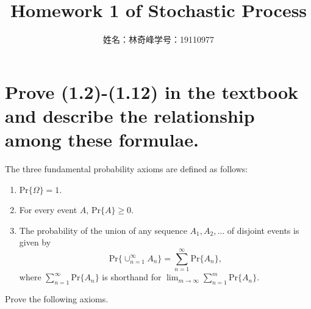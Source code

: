 \documentclass[UTF8]{article}
\begin{document}
    \title{Homework 1 of Stochastic Process}
    \author{姓名：林奇峰\qquad 学号：19110977}
    \maketitle

    \section{Prove (1.2)-(1.12) in the textbook and describe the relationship among these formulae.}

    The three fundamental probability axioms are defined as follows:
    \begin{enumerate}
        \item $\text{Pr}\{\Omega\}=1$.
        \item For every event $A$, $\text{Pr}\{A\}\geq0$. 
        \item The probability of the union of any sequence $A_1,A_2,\dots$ of disjoint events is given by
        \setcounter{equation}{0}
        \begin{equation}
            \label{eq:1}
            \text{Pr}\big\{\cup^\infty_{n=1}A_n\}=\sum^\infty_{n=1}\text{Pr}\{A_n\},
        \end{equation}
        where $\sum^\infty_{n=1}\text{Pr}\{A_n\}$ is shorthand for $\lim_{m\rightarrow\infty}\sum^m_{n=1}\text{Pr}\{A_n\}$.
    \end{enumerate}

    Prove the following axioms.
\end{document}
